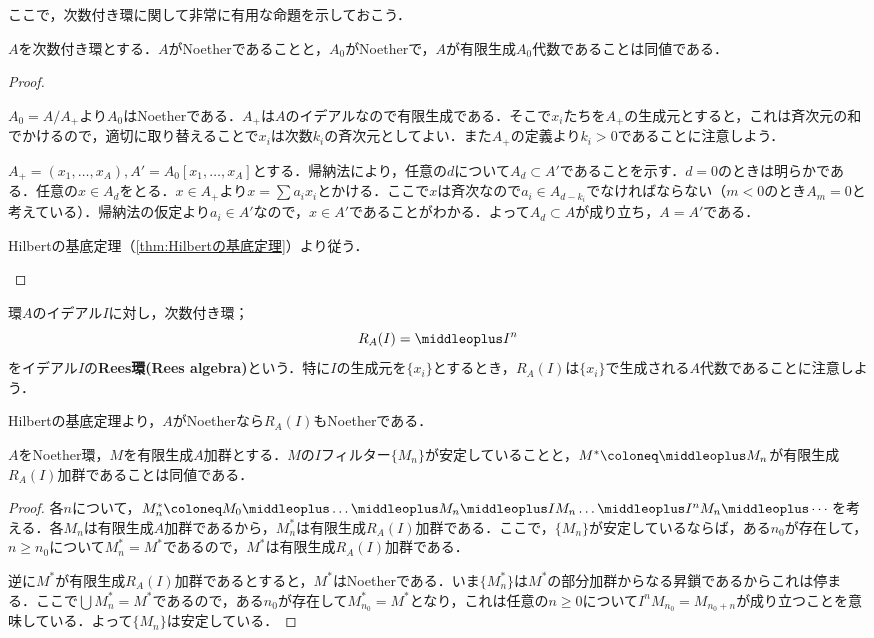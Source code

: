 ここで，次数付き環に関して非常に有用な命題を示しておこう．

\begin{prop}\label{prop:次数付き環のNoether性}
	$A$を次数付き環とする．$A$がNoetherであることと，$A_0$がNoetherで，$A$が有限生成$A_0$代数であることは同値である．
\end{prop}

\begin{proof}
	\begin{eqv}
		\item $A_0=A/A_+$より$A_0$はNoetherである．$A_+$は$A$のイデアルなので有限生成である．そこで$x_i$たちを$A_+$の生成元とすると，これは斉次元の和でかけるので，適切に取り替えることで$x_i$は次数$k_i$の斉次元としてよい．また$A_+$の定義より$k_i>0$であることに注意しよう．
		
		$A_+=(x_1,\dots,x_A), A'=A_0[x_1,\dots,x_A]$とする．帰納法により，任意の$d$について$A_d\subset A'$であることを示す．$d=0$のときは明らかである．任意の$x\in A_d$をとる．$x\in A_+$より$x=\sum a_ix_i$とかける．ここで$x$は斉次なので$a_i\in A_{d-k_i}$でなければならない（$m<0$のとき$A_m=0$と考えている）．帰納法の仮定より$a_i\in A'$なので，$x\in A'$であることがわかる．よって$A_d\subset A$が成り立ち，$A=A'$である．
		
		\item Hilbertの基底定理（\ref{thm:Hilbertの基底定理}）より従う．
	\end{eqv}
\end{proof}

\begin{defi}[Rees環]
	環$A$のイデアル$I$に対し，次数付き環；
	\[R_A(I)=\middleoplus I^n\]
	をイデアル$I$の\textbf{Rees環(Rees algebra)}という．特に$I$の生成元を$\{x_i\}$とするとき，$R_A(I)$は$\{x_i\}$で生成される$A$代数であることに注意しよう．
\end{defi}

Hilbertの基底定理より，$A$がNoetherなら$R_A(I)$もNoetherである．

\begin{lem}
	$A$をNoether環，$M$を有限生成$A$加群とする．$M$の$I$フィルター$\{M_n\}$が安定していることと，$M^\ast\coloneq \middleoplus M_n$が有限生成$R_A(I)$加群であることは同値である．
\end{lem}

\begin{proof}
	各$n$について，$M_n^\ast\coloneq M_0\middleoplus\dots\middleoplus M_n\middleoplus IM_n\dots\middleoplus I^nM_n\middleoplus\cdots$を考える．各$M_n$は有限生成$A$加群であるから，$M_n^\ast$は有限生成$R_A(I)$加群である．ここで，$\{M_n\}$が安定しているならば，ある$n_0$が存在して，$n\geq n_0$について$M_n^\ast=M^\ast$であるので，$M^\ast$は有限生成$R_A(I)$加群である．
	
	逆に$M^\ast$が有限生成$R_A(I)$加群であるとすると，$M^\ast$はNoetherである．いま$\{M_n^\ast\}$は$M^\ast$の部分加群からなる昇鎖であるからこれは停まる．ここで$\bigcup M_n^\ast=M^\ast$であるので，ある$n_0$が存在して$M_{n_0}^\ast=M^\ast$となり，これは任意の$n\geq0$について$I^nM_{n_0}=M_{n_0+n}$が成り立つことを意味している．よって$\{M_n\}$は安定している．
\end{proof}

